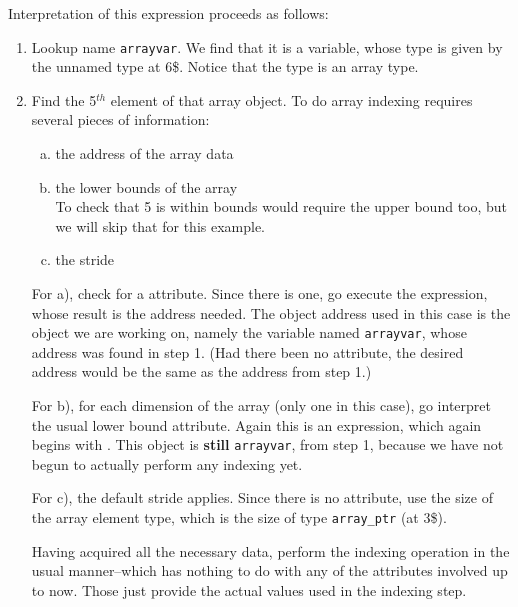 Interpretation of this expression proceeds as follows:
\begin{enumerate}[1. ]

\item Lookup name \texttt{arrayvar}. We find that it is a variable,
whose type is given by the unnamed type at 6\$. Notice that
the type is an array type.


\item Find the 5$^{th}$ element of that array object. To do array
indexing requires several pieces of information:
\begin{enumerate}[a) ]

\item  the address of the array data

\item the lower bounds of the array \\
\lbrack To check that 5 is within bounds would require the upper
bound too, but we will skip that for this example. \rbrack

\item the stride 

\end{enumerate}

For a), check for a 
\DWATdatalocation{} attribute. 
Since there is one, go execute the expression, whose result is
the address needed. The object address used in this case
is the object we are working on, namely the variable named
\texttt{arrayvar}, whose address was found in step 1. (Had there been
no \DWATdatalocation{} attribute, the desired address would
be the same as the address from step 1.)

For b), for each dimension of the array (only one
in this case), go interpret the usual lower bound
attribute. Again this is an expression, which again begins
with \DWOPpushobjectaddress. This object is 
\textbf{still} \texttt{arrayvar},
from step 1, because we have not begun to actually perform
any indexing yet.

For c), the default stride applies. Since there is no
\DWATbytestride{} attribute, use the size of the array element
type, which is the size of type \texttt{array\_ptr} (at 3\$).

\clearpage

Having acquired all the necessary data, perform the indexing
operation in the usual manner--which has nothing to do with
any of the attributes involved up to now. Those just provide
the actual values used in the indexing step.


\end{enumerate}
